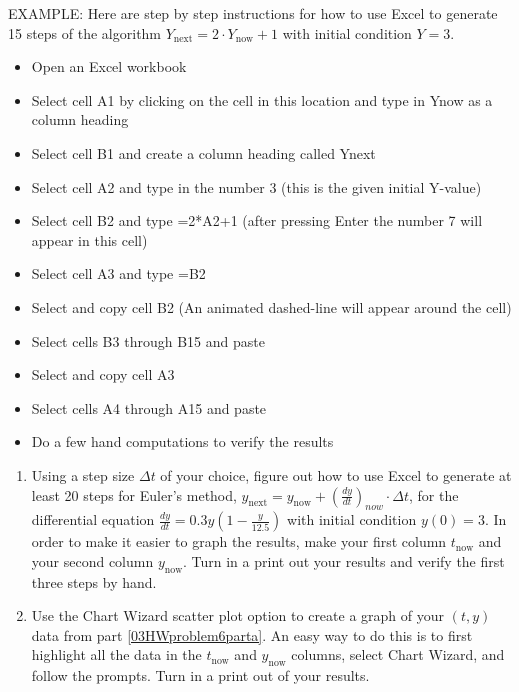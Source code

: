 \begin{enumerate}
EXAMPLE:  Here are step by step instructions for how to use Excel to generate 15 steps of the algorithm   $Y_{\textrm{next}} = 2 \cdot Y_{\textrm{now}} + 1$ with initial condition $Y = 3$. 

\begin{itemize}
\item	Open an Excel workbook 
\item	Select cell A1 by clicking on the cell in this location and type in Ynow as a column heading
\item	Select cell B1 and create a column heading called Ynext
\item	Select cell A2 and type in the number 3 (this is the given initial Y-value)
\item	Select cell B2 and type =2*A2+1 (after pressing Enter the number 7 will appear in this cell)
\item	Select cell A3 and type =B2
\item	Select and copy cell B2  (An animated dashed-line will appear around the cell)
\item	Select cells B3 through B15 and paste 
\item	Select and copy cell A3
\item	Select cells A4 through A15 and paste
\item	Do a few hand computations to verify the results

\end{itemize}
\begin{enumerate}
\item	Using a step size $\Delta t$ of your choice, figure out how to use Excel to generate at least 20 steps for Euler's method, $\displaystyle y_{\textrm{next}} = y_{\textrm{now}} + (\frac{dy}{dt})_{now}\cdot\Delta t$, for the differential equation $\displaystyle\frac{dy}{dt}=0.3y(1-\frac{y}{12.5})$ with initial condition $y(0) = 3$. In order to make it easier to graph the results, make your first column $t_{\textrm{now}}$ and your second column $y_{\textrm{now}}$. Turn in a print out your results and verify the first three steps by hand. \label{03HWproblem6parta}

\item	Use the Chart Wizard scatter plot option to create a graph of your $(t, y)$ data from part \ref{03HWproblem6parta}. An easy way to do this is to first highlight all the data in the $t_{\textrm{now}}$ and $y_{\textrm{now}}$ columns, select Chart Wizard, and follow the prompts. Turn in a print out of your results. \label{03HWproblem6partb}
\end{enumerate}


\end{enumerate}
